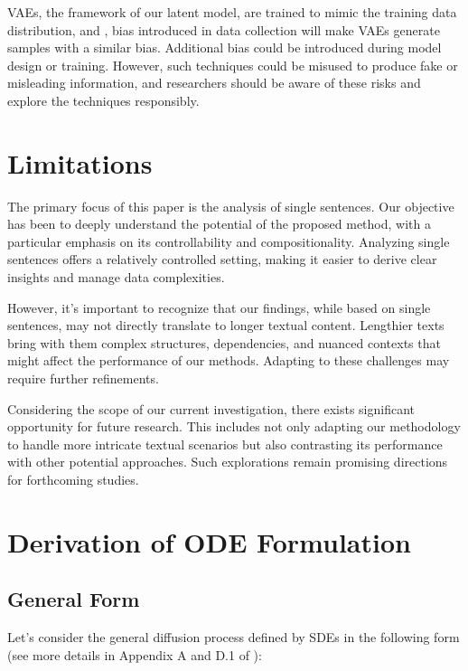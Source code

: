 \documentclass[11pt]{article}
\begin{document}
VAEs, the framework of our latent model, are trained to mimic the training data distribution, and , bias introduced in data collection will make VAEs generate samples with a similar bias. Additional bias could be introduced during model design or training. However, such techniques could be misused to produce fake or misleading information, and researchers should be aware of these risks and explore the techniques responsibly.
\section*{Limitations}
The primary focus of this paper is the analysis of single sentences. Our objective has been to deeply understand the potential of the proposed method, with a particular emphasis on its controllability and compositionality. Analyzing single sentences offers a relatively controlled setting, making it easier to derive clear insights and manage data complexities.

However, it's important to recognize that our findings, while based on single sentences, may not directly translate to longer textual content. Lengthier texts bring with them complex structures, dependencies, and nuanced contexts that might affect the performance of our methods. Adapting to these challenges may require further refinements.



Considering the scope of our current investigation, there exists significant opportunity for future research. This includes not only adapting our methodology to handle more intricate textual scenarios but also contrasting its performance with other potential approaches. Such explorations remain promising directions for forthcoming studies.
%
 



\clearpage
\appendix

\onecolumn
\section{Derivation of ODE Formulation}
\label{app:derivation_ode}
\newcommand{\td}{\text d}
\newcommand{\gxt}{\bm{G}(\bm{x},t)}
\newcommand{\bmx}{\bm x}
\newcommand{\fxt}{\bm f(\bm x,t)}
\newcommand{\barw}{\Bar{\bm w}}
\subsection{General Form}
Let's consider the general diffusion process defined by SDEs in the following form (see more details in Appendix A and D.1 of \citet{DBLP:conf/iclr/0011SKKEP21}):
\end{document}
